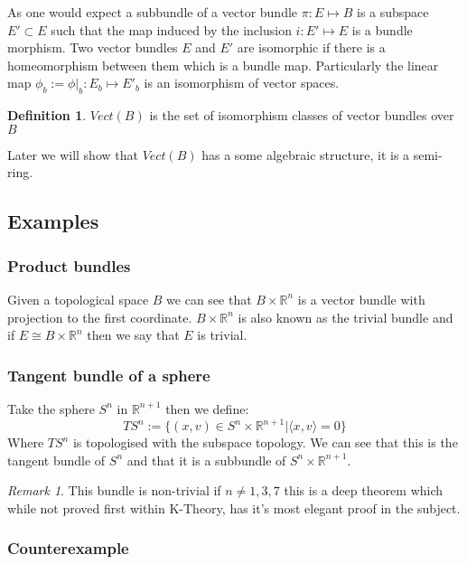 \documentclass[a4paper,10pt]{article}
\theoremstyle{plain}%
\theoremstyle{definition}
\newtheorem{defn}{Definition}
\theoremstyle{remark}
\newtheorem{rem}{Remark}
\newcommand{\RR}{\mathbb{R}}
\begin{document}
As one would expect a subbundle of a vector bundle $\pi:E\mapsto B$ is a subspace $E'\subset E$
such that the map induced by the inclusion $i:E'\mapsto E$ is a bundle morphism. Two 
vector bundles $E$ and $E'$ are isomorphic if there is a homeomorphism between them which is a bundle map.
Particularly the linear map $\phi_b:=\phi|_b :E_b \mapsto E'_b$ is an isomorphism of vector spaces.

\begin{defn}
  $Vect(B)$ is the set of isomorphism classes of vector bundles over $B$ 
\end{defn}

Later we will show that $Vect(B)$ has a some algebraic structure, it is a semi-ring.

\subsection{Examples}

\subsubsection{Product bundles}

Given a topological space $B$ we can see that $B\times \RR^n$ is a vector bundle with projection to
the first coordinate. $B \times\RR^n$ is also known as the trivial bundle and if $E\cong B\times \RR^n$ 
then we say that $E$ is trivial.

\subsubsection{Tangent bundle of a sphere}

Take the sphere $S^n$ in $\RR^{n+1}$ then we define:
$$TS^n:=\{(x,v) \in S^n\times \RR^{n+1} | \langle x,v \rangle =0\} $$
Where $TS^n$ is topologised with the subspace topology.
We can see that this is the tangent bundle of $S^n$ and that it is a subbundle of $S^n\times \RR^{n+1}$.

\begin{rem}
 This bundle is non-trivial if $n\neq 1,3,7$ this is a deep theorem which while not proved first within 
K-Theory, has it's most elegant proof in the subject.
\end{rem}


\subsubsection{Counterexample}
\end{document}
